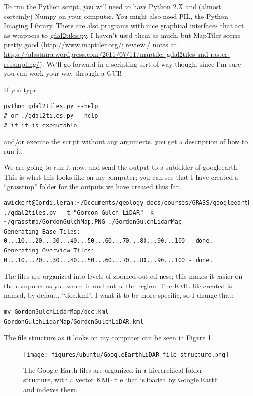 \documentclass{book}
\begin{document}
To run the Python script, you will need to have Python 2.X and (almost certainly) Numpy on your computer. You might also need PIL, the Python Imaging Library. There are also programs with nice graphical interfaces that act as wrappers to \url{gdal2tiles.py}. I haven't used them as much, but MapTiler seems pretty good (\url{http://www.maptiler.org/}; review / notes at \url{https://alastaira.wordpress.com/2011/07/11/maptiler-gdal2tiles-and-raster-resampling/}). We'll go forward in a scripting sort of way though, since I'm sure you can work your way through a GUI!

If you type
\begin{lstlisting}
python gdal2tiles.py --help
# or ./gdal2tiles.py --help
# if it is executable
\end{lstlisting}
and/or execute the script without any arguments, you get a description of how to run it.

We are going to run it now, and send the output to a subfolder of googleearth. This is what this looks like on my computer; you can see that I have created a ``grasstmp'' folder for the outputs we have created thus far.
\begin{lstlisting}
awickert@Cordilleran:~/Documents/geology_docs/courses/GRASS/googleearth$ ./gdal2tiles.py  -t "Gordon Gulch LiDAR" -k ~/grasstmp/GordonGulchMap.PNG ./GordonGulchLidarMap
Generating Base Tiles:
0...10...20...30...40...50...60...70...80...90...100 - done.
Generating Overview Tiles:
0...10...20...30...40...50...60...70...80...90...100 - done.
\end{lstlisting}

The files are organized into levels of zoomed-out-ed-ness; this makes it easier on the computer as you zoom in and out of the region. The KML file created is named, by default, ``doc.kml''. I want it to be more specific, so I change that:
\begin{lstlisting}
mv GordonGulchLidarMap/doc.kml GordonGulchLidarMap/GordonGulchLiDAR.kml
\end{lstlisting}
The file structure as it looks on my computer can be seen in Figure \ref{fig:GoogleEarthLiDAR_file_structure}.

\begin{figure}[h]
 \begin{center}
 \texttt{[image: figures/ubuntu/GoogleEarthLiDAR\_file\_structure.png]}
 \caption{The Google Earth files are organized in a hierarchical folder structure, with a vector KML file that is loaded by Google Earth and indexes them.}
 \label{fig:GoogleEarthLiDAR_file_structure}
 \end{center}
\end{figure}
\end{document}
